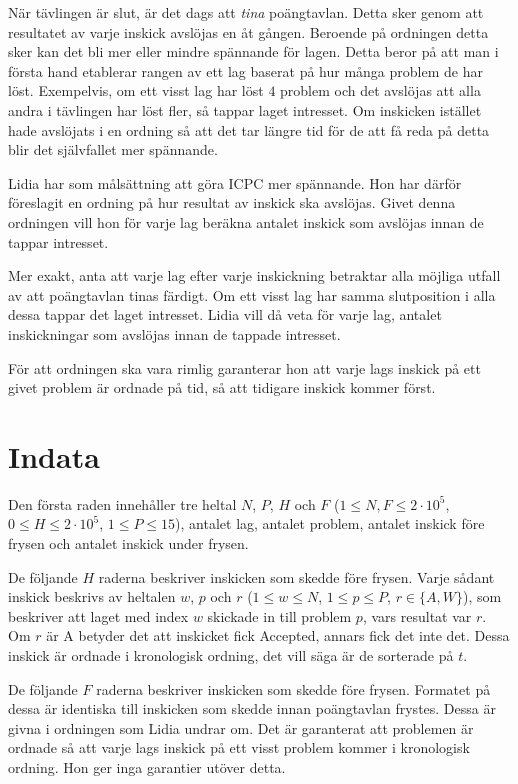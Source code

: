 När tävlingen är slut, är det dags att \textit{tina} poängtavlan.
Detta sker genom att resultatet av varje inskick avslöjas en åt gången.
Beroende på ordningen detta sker kan det bli mer eller mindre spännande för lagen.
Detta beror på att man i första hand etablerar rangen av ett lag baserat på hur många problem de har löst.
Exempelvis, om ett visst lag har löst $4$ problem och det avslöjas att alla andra i tävlingen har löst fler,
så tappar laget intresset.
Om inskicken istället hade avslöjats i en ordning så att det tar längre tid för de att få reda på detta blir det självfallet mer spännande.

Lidia har som målsättning att göra ICPC mer spännande.
Hon har därför föreslagit en ordning på hur resultat av inskick ska avslöjas.
Givet denna ordningen vill hon för varje lag beräkna antalet inskick som avslöjas innan de tappar intresset.

Mer exakt, anta att varje lag efter varje inskickning betraktar alla möjliga utfall av att poängtavlan tinas färdigt.
Om ett visst lag har samma slutposition i alla dessa tappar det laget intresset.
Lidia vill då veta för varje lag, antalet inskickningar som avslöjas innan de tappade intresset.

För att ordningen ska vara rimlig garanterar hon att varje lags inskick på ett givet problem är ordnade på tid,
så att tidigare inskick kommer först.

\section*{Indata}
Den första raden innehåller tre heltal $N$, $P$, $H$ och $F$
($1 \leq N, F \leq 2 \cdot 10^5$, $0 \leq H \leq 2 \cdot 10^5$, $1 \leq P \leq 15$),
antalet lag, antalet problem, antalet inskick före frysen och antalet inskick under frysen.

De följande $H$ raderna beskriver inskicken som skedde före frysen.
Varje sådant inskick beskrivs av heltalen $w$, $p$ och $r$
($1 \leq w \leq N$, $1 \leq p \leq P$, $r \in \{A,W\}$),
som beskriver att laget med index $w$ skickade in till problem $p$,
vars resultat var $r$. Om $r$ är A betyder det att inskicket fick Accepted, annars fick det inte det.
Dessa inskick är ordnade i kronologisk ordning, det vill säga är de sorterade på $t$.

De följande $F$ raderna beskriver inskicken som skedde före frysen.
Formatet på dessa är identiska till inskicken som skedde innan poängtavlan frystes.
Dessa är givna i ordningen som Lidia undrar om.
Det är garanterat att problemen är ordnade så att varje lags inskick på ett visst problem kommer i kronologisk ordning.
Hon ger inga garantier utöver detta.

